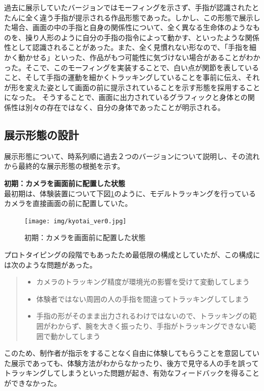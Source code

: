 過去に展示していたバージョンではモーフィングを示さず、手指が認識されたとたんに全く違う手指が提示される作品形態であった。しかし、この形態で展示した場合、画面の中の手指と自身の関係性について、全く異なる生命体のようなものを、操り人形のように自分の手指の指令によって動かす、といったような関係性として認識されることがあった。また、全く見慣れない形なので、「手指を細かく動かせる」といった、作品がもつ可能性に気づけない場合があることがわかった。そこで、このモーフィングを実装することで、白い点が関節を表していること、そして手指の運動を細かくトラッキングしていることを事前に伝え、それが形を変えた姿として画面の前に提示されていることを示す形態を採用することになった。
そうすることで、画面に出力されているグラフィックと身体との関係性は別々の存在ではなく、自分の身体であったことが明示される。

\subsection{展示形態の設計}
展示形態について、時系列順に過去２つのバージョンについて説明し、その流れから最終的な展示形態の根拠を示す。

\textbf{初期：カメラを画面前に配置した状態}\\
最初期は、体験装置について下図\ref{fig:kyotai_ver0}のように、モデルトラッキングを行っているカメラを直接画面の前に配置していた。
\begin{figure}[H]
  \centering
  \texttt{[image: img/kyotai\_ver0.jpg]}
  \caption{初期：カメラを画面前に配置した状態}
  \label{fig:kyotai_ver0}
\end{figure}

プロトタイピングの段階でもあったため最低限の構成としていたが、この構成には次のような問題があった。
\begin{quote}
  \begin{itemize}
    \item カメラのトラッキング精度が環境光の影響を受けて変動してしまう
    \item 体験者ではない周囲の人の手指を間違ってトラッキングしてしまう
    \item 手指の形がそのまま出力されるわけではないので、トラッキングの範囲がわからず、腕を大きく振ったり、手指がトラッキングできない範囲で動かしてしまう
  \end{itemize}
\end{quote}

このため、制作者が指示をすることなく自由に体験してもらうことを意図していた展示であっても、体験方法がわからなかったり、後方で見守る人の手を誤ってトラッキングしてしまうといった問題が起き、有効なフィードバックを得ることができなかった。

